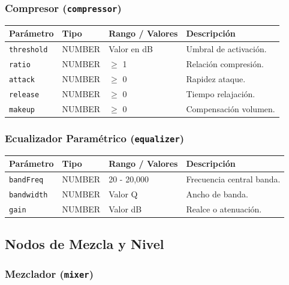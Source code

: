 \subsubsection{Compresor (\texttt{compressor})}

\begin{table}[H]
\centering
\small
\begin{tabular}{@{}llp{3cm}p{4cm}@{}}
\toprule
Parámetro & Tipo & Rango / Valores & Descripción \\ \midrule
\texttt{threshold} & NUMBER & Valor en dB & Umbral de activación. \\
\texttt{ratio} & NUMBER & $\ge$ 1 & Relación compresión. \\
\texttt{attack} & NUMBER & $\ge$ 0 & Rapidez ataque. \\
\texttt{release} & NUMBER & $\ge$ 0 & Tiempo relajación. \\
\texttt{makeup} & NUMBER & $\ge$ 0 & Compensación volumen. \\ \bottomrule
\end{tabular}
\end{table}

\subsubsection{Ecualizador Paramétrico (\texttt{equalizer})}

\begin{table}[H]
\centering
\small
\begin{tabular}{@{}llp{3cm}p{4cm}@{}}
\toprule
Parámetro & Tipo & Rango / Valores & Descripción \\ \midrule
\texttt{bandFreq} & NUMBER & 20 - 20,000 & Frecuencia central banda. \\
\texttt{bandwidth} & NUMBER & Valor Q & Ancho de banda. \\
\texttt{gain} & NUMBER & Valor dB & Realce o atenuación. \\ \bottomrule
\end{tabular}
\end{table}

\subsection{Nodos de Mezcla y Nivel}

\subsubsection{Mezclador (\texttt{mixer})}

